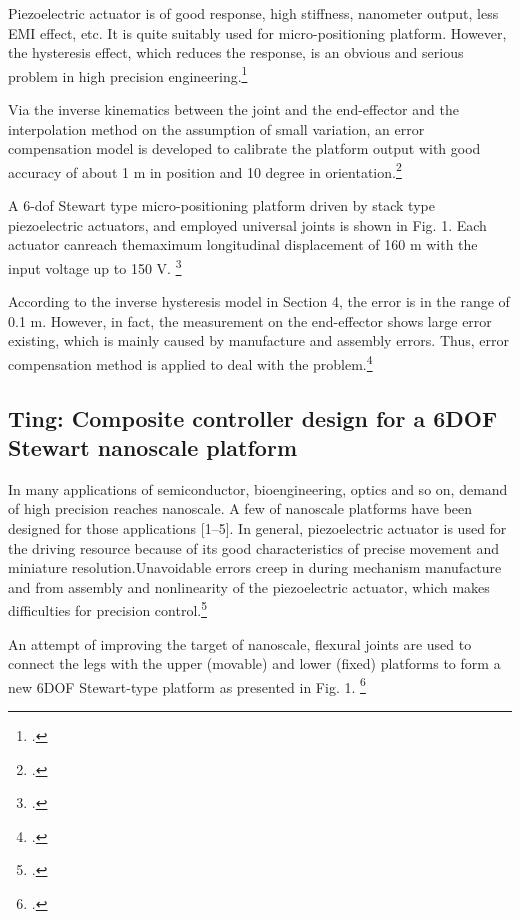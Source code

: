 Piezoelectric actuator is of good response, high stiffness,
nanometer output, less EMI effect, etc. It is quite suitably used
for micro-positioning platform. However, the hysteresis effect,
which reduces the response, is an obvious and serious problem in
high precision engineering.\footcite[Vgl.][226]{Ting2007}

Via the inverse kinematics between the
joint and the end-effector and the interpolation method on the
assumption of small variation, an error compensation model is
developed to calibrate the platform output with good accuracy
of about 1 m in position and 10 degree in orientation.\footcite[Vgl.][266]{Ting2007}

A 6-dof Stewart type micro-positioning platform driven by
stack type piezoelectric actuators, and employed universal joints
is shown in Fig. 1. Each actuator canreach themaximum longitudinal displacement of 160 m with the input voltage up to 150 V. \footcite[Vgl.][226]{Ting2007}

According to the inverse hysteresis
model in Section 4, the error is in the range of 0.1 m. However,
in fact, the measurement on the end-effector shows large error
existing, which is mainly caused by manufacture and assembly
errors. Thus, error compensation method is applied to deal with
the problem.\footcite[Vgl.][232]{Ting2007}

\subsection{Ting: Composite controller design for a 6DOF Stewart nanoscale platform}
In many applications of semiconductor, bioengineering, optics
and so on, demand of high precision reaches nanoscale. A few of
nanoscale platforms have been designed for those applications
[1–5]. In general, piezoelectric actuator is used for the driving
resource because of its good characteristics of precise movement
and miniature resolution.Unavoidable errors creep in during
mechanism manufacture and from assembly and nonlinearity of
the piezoelectric actuator, which makes difficulties for precision
control.\footcite[Vgl.][671]{Ting2013}

An attempt of
improving the target of nanoscale, flexural joints are used to
connect the legs with the upper (movable) and lower (fixed)
platforms to form a new 6DOF Stewart-type platform as presented in Fig. 1. \footcite[Vgl.][671]{Ting2013}

